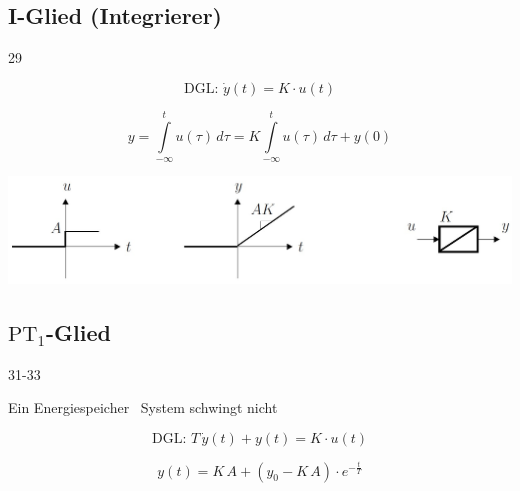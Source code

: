 \subsection{I-Glied (Integrierer)}{29}

\begin{minipage}{0.48\columnwidth}
    $$ \boxed{ \text{DGL: } \dot{y}(t) = K \cdot u(t) }  $$
\end{minipage}
\hfill
\begin{minipage}{0.48\columnwidth}
    $$ \boxed{ \scriptstyle{ y = \int\limits_{- \infty}^t u(\tau) \, d \tau = K \int\limits_{- \infty}^t u(\tau) \, d \tau + y(0) } }$$
\end{minipage}

\includegraphics[width=0.9\columnwidth]{images/i-glied} 


\subsection{$\text{PT}_1$-Glied}{31-33}

Ein Energiespeicher \textrightarrow\ System schwingt nicht

\begin{minipage}{0.48\columnwidth}
    $$ \boxed{ \text{DGL: } T \, \dot{y}(t) + y(t) = K \cdot u(t) }  $$
\end{minipage}
\hfill
\begin{minipage}{0.48\columnwidth}
    $$ \boxed{ y(t) = K \, A + (y_0 - K \, A) \cdot e^{- \frac{t}{T}} } $$
\end{minipage}


